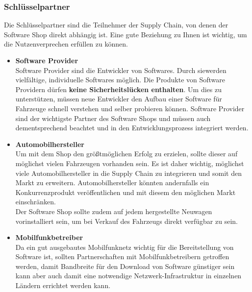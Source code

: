 \subsubsection{Schlüsselpartner}
Die Schlüsselpartner sind die Teilnehmer der Supply Chain, von denen der Software Shop direkt abhängig ist. Eine gute Beziehung zu Ihnen ist wichtig, um die Nutzenverprechen erfüllen zu können.
\begin{itemize}
	\item \textbf{Software Provider}\\
	Software Provider sind die Entwickler von Softwares. Durch siewerden vielfältige, individuelle Softwares möglich. Die Produkte von Software Providern dürfen \textbf{keine Sicherheitslücken enthalten}. Um dies zu unterstützen, müssen neue Entwickler den Aufbau einer Software für Fahrzeuge schnell verstehen und selber probieren können. Software Provider sind der wichtigste Partner des Software Shops und müssen auch dementsprechend beachtet und in den Entwicklungsprozess integriert werden.\\
	
	\item \textbf{Automobilhersteller}\\
	Um mit dem Shop den größtmöglichen Erfolg zu erzielen, sollte dieser auf möglichst vielen Fahrzeugen vorhanden sein. Es ist daher wichtig, möglichst viele Automobilhersteller in die Supply Chain zu integrieren und somit den Markt zu erweitern. Automobilhersteller könnten andernfalls ein Konkurrenzprodukt veröffentlichen und mit diesem den möglichen Markt einschränken.\\
	Der Software Shop sollte zudem auf jedem hergestellte Neuwagen vorinstalliert sein, um bei Verkauf des Fahrzeugs direkt verfügbar zu sein.
	
	\item \textbf{Mobilfunkbetreiber}\\
	Da ein gut ausgebautes Mobilfunknetz wichtig für die Bereitstellung von Software ist, sollten Partnerschaften mit Mobilfunkbetreibern getroffen werden, damit Bandbreite für den Download von Software günstiger sein kann aber auch damit eine notwendige Netzwerk-Infrastruktur in einzelnen Ländern errichtet werden kann.
	
\end{itemize}

